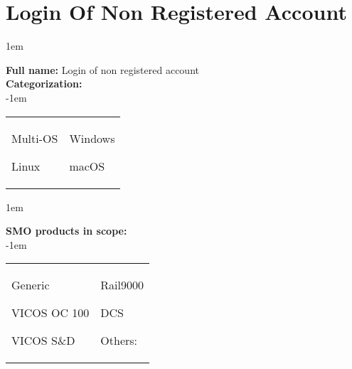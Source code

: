
%
%

\section{Login Of Non Registered Account}
\label{15021}

\openup 1em

\textbf{Full name:} Login of non registered account\hrulefill \\
{\bf Categorization:} \\

\openup -1em
\vspace{-3em}

\begin{tabular}{p{}p{}}

\begin{todolist}
  	\item Multi-OS
	\item Linux
\end{todolist}
&
\begin{todolist}
	\item[\done] Windows
	\item macOS
\end{todolist}

\end{tabular}

\openup 1em

{\bf SMO products in scope:} \\

\openup -1em
\vspace{-3em}

\begin{tabular}{p{}p{}}

\begin{todolist}
  \item[\done] Generic
  \item[\done] VICOS OC 100
  \item[\done] VICOS S\&D
\end{todolist}
&
\begin{todolist}
  \item Rail9000
  \item DCS
  \item Others: \hrulefill
\end{todolist}

\end{tabular}

